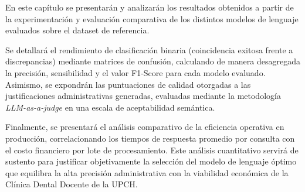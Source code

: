 \label{ch:resultados}
En este capítulo se presentarán y analizarán los resultados obtenidos a partir de la experimentación y evaluación comparativa de los distintos modelos de lenguaje evaluados sobre el dataset de referencia. 

Se detallará el rendimiento de clasificación binaria (coincidencia exitosa frente a discrepancias) mediante matrices de confusión, calculando de manera desagregada la precisión, sensibilidad y el valor F1-Score para cada modelo evaluado. Asimismo, se expondrán las puntuaciones de calidad otorgadas a las justificaciones administrativas generadas, evaluadas mediante la metodología \textit{LLM-as-a-judge} en una escala de aceptabilidad semántica.

Finalmente, se presentará el análisis comparativo de la eficiencia operativa en producción, correlacionando los tiempos de respuesta promedio por consulta con el costo financiero por lote de procesamiento. Este análisis cuantitativo servirá de sustento para justificar objetivamente la selección del modelo de lenguaje óptimo que equilibra la alta precisión administrativa con la viabilidad económica de la Clínica Dental Docente de la UPCH.
